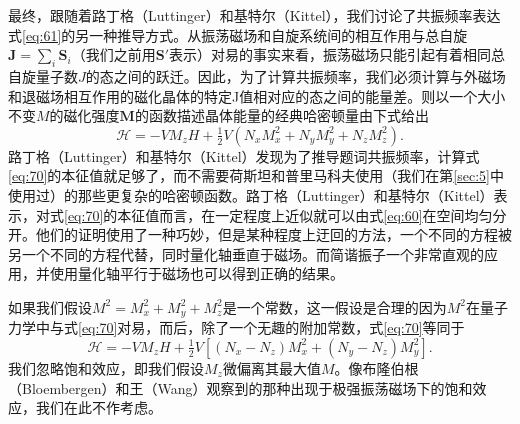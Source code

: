 \documentclass{article}
\begin{document}
最终，跟随着路丁格（Luttinger）和基特尔（Kittel），我们讨论了共振频率表达式\eqref{eq:61}的另一种推导方式。从振荡磁场和自旋系统间的相互作用与总自旋$\mathbf{J}=\sum_i\mathbf{S}_i$（我们之前用$\mathbf{S}'$表示）对易的事实来看，振荡磁场只能引起有着相同总自旋量子数$J$的态之间的跃迁。因此，为了计算共振频率，我们必须计算与外磁场和退磁场相互作用的磁化晶体的特定J值相对应的态之间的能量差。则以一个大小不变$M$的磁化强度$\mathbf{M}$的函数描述晶体能量的经典哈密顿量由下式给出
\begin{equation} \label{eq:70}
\mathcal{H}=-VM_zH+\tfrac{1}{2}V(N_xM_x^2+N_yM_y^2+N_zM_z^2).
\end{equation}
路丁格（Luttinger）和基特尔（Kittel）发现为了推导题词共振频率，计算式\eqref{eq:70}的本征值就足够了，而不需要荷斯坦和普里马科夫使用（我们在第\ref{sec:5}中使用过）的那些更复杂的哈密顿函数。路丁格（Luttinger）和基特尔（Kittel）表示，对式\eqref{eq:70}的本征值而言，在一定程度上近似就可以由式\eqref{eq:60}在空间均匀分开。他们的证明使用了一种巧妙，但是某种程度上迂回的方法，一个不同的方程被另一个不同的方程代替，同时量化轴垂直于磁场。而简谐振子一个非常直观的应用，并使用量化轴平行于磁场也可以得到正确的结果。

如果我们假设$M^2=M_x^2+M_y^2+M_z^2$是一个常数，这一假设是合理的因为$M^2$在量子力学中与式\eqref{eq:70}对易，而后，除了一个无趣的附加常数，式\eqref{eq:70}等同于
\begin{equation} \label{eq:71}
\mathcal{H}=-VM_zH+\tfrac{1}{2}V[(N_x-N_z)M_x^2+(N_y-N_z)M_y^2].
\end{equation}
我们忽略饱和效应，即我们假设$M_z$微偏离其最大值$M$。像布隆伯根（Bloembergen）和王（Wang）观察到的那种出现于极强振荡磁场下的饱和效应，我们在此不作考虑。
\end{document}
